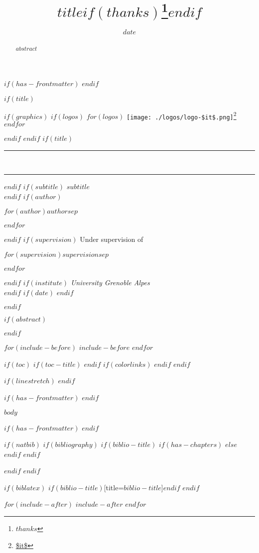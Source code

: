 \documentclass[
$if(fontsize)$
  $fontsize$,
$else$
  12pt
$endif$
$if(papersize)$
  $papersize$paper,
$endif$
$for(classoption)$
  $classoption$$sep$,
$endfor$
]{$documentclass$}
\title{$title$$if(thanks)$\thanks{$thanks$}$endif$}
\date{$date$}
\makeatletter
\DeclareRobustCommand{\href}[2]{#2\footnote{\url{#1}}}
\def\subtitle{$subtitle$}
\def\author{$for(author)$$author$$sep$ \par $endfor$}
\def\institute{$for(institute)$$institute$$sep$ \par $endfor$}
\def\institute{
    University Grenoble Alpes
  }
\def\supervision{$for(supervision)$$supervision$$sep$ \par $endfor$}
\renewcommand{\maketitle}{%
  \begin{titlepage}
  $if(graphics)$
    $if(logos)$
      \vspace{3mm}%
      $for(logos)$
        \href{\$it$}{\texttt{[image: ./logos/logo-\$it\$.png]}}\hspace{3mm}%
      $endfor$
      \par%
    $endif$
  $endif$
  \vfill
  \centering
  $if(title)$
  \rule{\textwidth}{1.6pt}\vspace*{1pt} %
  \vspace{0.2cm} %
    {\Huge \@title\\} %
  \vspace{0cm} %
  \rule{\textwidth}{1.6pt} %
  $endif$
  $if(subtitle)$
  \vspace{2cm} %
    {\LARGE \subtitle\\} %
  \vspace{1cm} %
  $endif$
  $if(author)$
  \vspace{0.5\baselineskip} %
    {\scshape\Large \author\\} %
  \vspace{0.5\baselineskip} %
  $endif$
  $if(supervision)$
  \vspace{0.8cm} %
    {\large Under supervision of\\}
    \vspace{0.2cm}
    {\scshape\large \par\supervision\\} %
  \vspace{0.5cm} %
  $endif$
  \vfill %
  $if(institute)$
  \textit{\large \institute\\} %
  $endif$
  $if(date)$
  \vspace{1.5cm} %
  {\large \@date}
  $endif$
  \end{titlepage}
}
\makeatother
\begin{document}
$if(has-frontmatter)$
  \frontmatter
$endif$

$if(title)$
  \maketitle
$endif$

$if(abstract)$
  \begin{abstract}
    $abstract$
  \end{abstract}
$endif$

$for(include-before)$
  $include-before$
$endfor$

$if(toc)$
  $if(toc-title)$
    \renewcommand*\contentsname{$toc-title$}
  $endif$
  {
  $if(colorlinks)$
    \hypersetup{linkcolor=$if(toccolor)$$toccolor$$else$$endif$}
  $endif$
  \setcounter{tocdepth}{$toc-depth$}
  \tableofcontents
  }
$endif$

$if(linestretch)$
$endif$

$if(has-frontmatter)$
  \mainmatter
$endif$

$body$

$if(has-frontmatter)$
  \backmatter
$endif$

$if(natbib)$
  $if(bibliography)$
    $if(biblio-title)$
      $if(has-chapters)$
        \renewcommand\bibname{$biblio-title$}
      $else$
        \renewcommand\refname{$biblio-title$}
      $endif$
    $endif$
    
  $endif$
$endif$

$if(biblatex)$
  \printbibliography$if(biblio-title)$[title=$biblio-title$]$endif$
$endif$

$for(include-after)$
  $include-after$
$endfor$
\end{document}
